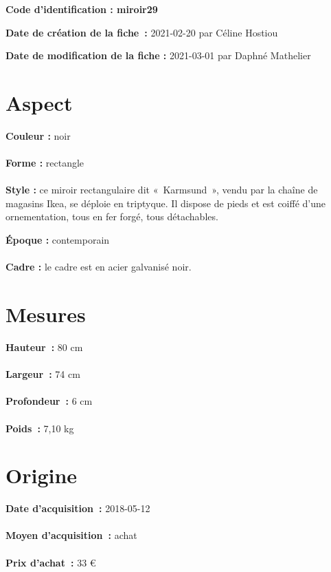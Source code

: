 
     {\bf \huge Code d’identification : miroir29} \\
    \newline \hr \begin{center} 
       
    \end{center} 
    \begin{itemize}
    
    \footnotesize {\item {\bf Date de création de la fiche :} 2021-02-20
    {par Céline Hostiou}} 
    \footnotesize {\item {\bf Date de modification de la fiche :} 2021-03-01
    {par Daphné Mathelier} \\}
    \end{itemize}
   \hr 
    \section* {Aspect} 
    {\bf \large Couleur :} noir
    \\ \\ {\bf \large Forme :} rectangle 
    \\ \\ {\bf \large Style :} 
            ce miroir rectangulaire dit « Karmsund », vendu par la chaîne de
            magasins Ikea, se déploie en triptyque. Il dispose de pieds et est coiffé d’une
            ornementation, tous en fer forgé, tous détachables.
         
        {\bf \large Époque :} contemporain 
    \\ \\ {\bf \large Cadre :} le cadre est en acier galvanisé noir.
         
    \section* {Mesures}
     {\bf \large Hauteur :} 80 cm
   \\ \\ {\bf \large Largeur :} 74 cm 
   \\ \\ {\bf \large Profondeur :} 6 cm  
   \\ \\ {\bf \large Poids :} 7,10 kg
  
    \section* {Origine}
    {\bf \large Date d’acquisition :} 2018-05-12 \\ \\
    {\bf \large Moyen d’acquisition :} achat \\ \\ {\bf \large Prix d’achat :}
        33 € 
      
